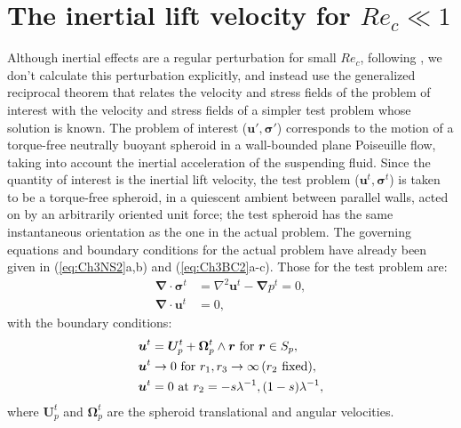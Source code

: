 \documentclass{jfm}
\begin{document}
 
\section{The inertial lift velocity for $Re_c\ll1$} \label{sec:Ch3Recsmall}

Although inertial effects are a regular perturbation for small $Re_c$, following \cite{holeal1974}, we don't calculate this perturbation explicitly, and instead use the generalized reciprocal theorem that relates the velocity and stress fields of the problem of interest with the velocity and stress fields of a simpler test problem whose solution is known. The problem of interest ($\bm{u}',\bm{\sigma}'$) corresponds to the motion of a torque-free neutrally buoyant spheroid in a wall-bounded plane Poiseuille flow, taking into account the inertial acceleration of the suspending fluid. Since the quantity of interest is the inertial lift velocity, the test problem ($\bm{u}^t,\bm{\sigma}^t$) is taken to be a torque-free spheroid, in a quiescent ambient between parallel walls, acted on by an arbitrarily oriented unit force; the test spheroid has the same instantaneous orientation as the one in the actual problem. The governing equations and boundary conditions for the actual problem have already been given in (\ref{eq:Ch3NS2}a,b) and (\ref{eq:Ch3BC2}a-c). Those for the test problem are:
\begin{subequations}
\begin{align}
\bm{\nabla}\cdot\bm{\sigma}^t&=\nabla^2 \bm{u}^t-\bm{\nabla} p^t = 0 ,\\
\bm{\nabla}\cdot \bm{u}^t&=0,
\end{align} \label{eq:Ch3NStest}
\end{subequations}
with the boundary conditions:
\begin{subequations}
	\begin{align} 
	\bm{u}^t&=\bm{U}_p^t+\bm{\Omega}_p^t\wedge\bm{r} \text{ for } \bm{r}\in S_p,\\
	\bm{u}^t &\rightarrow 0 \text{ for } r_1,r_3 \rightarrow \infty\,(r_2\hspace*{0.05in}\text{fixed}),\\
	\bm{u}^t&=0 \text{ at } r_2=-s\lambda^{-1}, (1-s)\lambda^{-1},
	\end{align} \label{eq:Ch3BCtest}
\end{subequations}
where $\bm{U}_p^t$ and $\bm{\Omega}_p^t$ are the spheroid translational and angular velocities.
\end{document}
